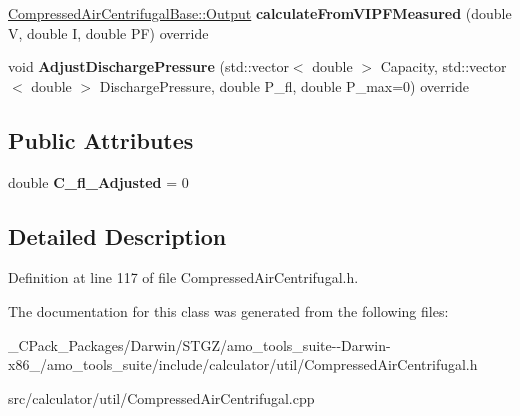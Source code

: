 \begin{DoxyCompactItemize}
\item 
\mbox{\label{class_compressed_air_centrifugal___load_unload_adb9a3b48125a7a5e95e6b433d3fe0c96}} 
\hyperlink{struct_compressed_air_centrifugal_base_1_1_output}{Compressed\+Air\+Centrifugal\+Base\+::\+Output} {\bfseries calculate\+From\+V\+I\+P\+F\+Measured} (double V, double I, double PF) override
\item 
\mbox{\label{class_compressed_air_centrifugal___load_unload_a7ba88b9798eeff1a022d5a9630884d56}} 
void {\bfseries Adjust\+Discharge\+Pressure} (std\+::vector$<$ double $>$ Capacity, std\+::vector$<$ double $>$ Discharge\+Pressure, double P\+\_\+fl, double P\+\_\+max=0) override
\end{DoxyCompactItemize}
\subsection*{Public Attributes}
\begin{DoxyCompactItemize}
\item 
\mbox{\label{class_compressed_air_centrifugal___load_unload_ac1cf28a271c9f7093d1c6b182a343cd8}} 
double {\bfseries C\+\_\+fl\+\_\+\+Adjusted} = 0
\end{DoxyCompactItemize}


\subsection{Detailed Description}


Definition at line 117 of file Compressed\+Air\+Centrifugal.\+h.



The documentation for this class was generated from the following files\+:\begin{DoxyCompactItemize}
\item 
\+\_\+\+C\+Pack\+\_\+\+Packages/\+Darwin/\+S\+T\+G\+Z/amo\+\_\+tools\+\_\+suite-\/-\/\+Darwin-\/x86\+\_/amo\+\_\+tools\+\_\+suite/include/calculator/util/Compressed\+Air\+Centrifugal.\+h\item 
src/calculator/util/Compressed\+Air\+Centrifugal.\+cpp\end{DoxyCompactItemize}
